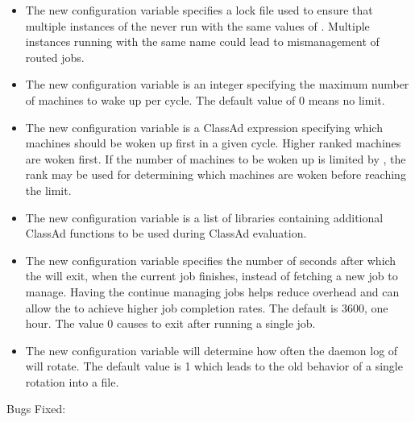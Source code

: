 \begin{itemize}

\item The new configuration variable   specifies a
  lock file used to
  ensure that multiple instances of the  never run
  with the same values of .
  Multiple instances running
  with the same name could lead to mismanagement of routed jobs.

\item The new configuration variable 
  is an integer
  specifying the maximum number of machines to wake up per cycle.
  The default value of 0 means no limit.

\item The new configuration variable 
  is a ClassAd
  expression specifying which machines should be woken up first in a
  given cycle.  Higher ranked machines are woken first.
  If the number of machines to be woken up is limited by
  , the rank may be used for
  determining which machines are woken before reaching the limit.

\item The new configuration variable 
  is a list of libraries
  containing additional ClassAd functions to be used during ClassAd
  evaluation.

\item The new configuration variable 
  specifies the number of seconds after which the  will exit,
  when the current job finishes, instead of fetching a new job to
  manage.  Having the  continue managing jobs helps
  reduce overhead and can allow the  to achieve higher
  job completion rates.  The default is 3600, one hour.  The value 0
  causes  to exit after running a single job.

\item The new configuration variable  
  will determine how often the daemon log of  will rotate.
  The default value is 1 which leads to the old behavior of a single 
  rotation into a  file.

\end{itemize}

\noindent Bugs Fixed:

